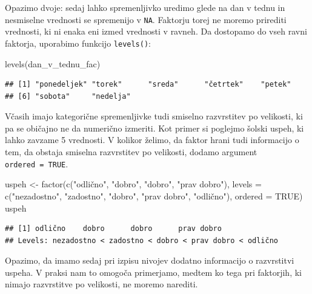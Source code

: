 \documentclass[
]{book}
\newenvironment{Shaded}{\begin{snugshade}}{\end{snugshade}}
\newcommand{\AttributeTok}[1]{\textcolor[rgb]{0.77,0.63,0.00}{#1}}
\newcommand{\ConstantTok}[1]{\textcolor[rgb]{0.00,0.00,0.00}{#1}}
\newcommand{\FunctionTok}[1]{\textcolor[rgb]{0.00,0.00,0.00}{#1}}
\newcommand{\NormalTok}[1]{#1}
\newcommand{\OtherTok}[1]{\textcolor[rgb]{0.56,0.35,0.01}{#1}}
\newcommand{\StringTok}[1]{\textcolor[rgb]{0.31,0.60,0.02}{#1}}
\begin{document}
Opazimo dvoje: sedaj lahko spremenljivko uredimo glede na dan v tednu in nesmiselne vrednosti se spremenijo v \texttt{NA}. Faktorju torej ne moremo prirediti vrednosti, ki ni enaka eni izmed vrednosti v ravneh. Da dostopamo do vseh ravni faktorja, uporabimo funkcijo \texttt{levels()}:

\begin{Shaded}
\begin{Highlighting}[]
\FunctionTok{levels}\NormalTok{(dan\_v\_tednu\_fac)}
\end{Highlighting}
\end{Shaded}

\begin{verbatim}
## [1] "ponedeljek" "torek"      "sreda"      "četrtek"    "petek"     
## [6] "sobota"     "nedelja"
\end{verbatim}

Včasih imajo kategorične spremenljivke tudi smiselno razvrstitev po velikosti, ki pa se običajno ne da numerično izmeriti. Kot primer si poglejmo šolski uspeh, ki lahko zavzame 5 vrednosti. V kolikor želimo, da faktor hrani tudi informacijo o tem, da obstaja smiselna razvrstitev po velikosti, dodamo argument \texttt{ordered\ =\ TRUE}.

\begin{Shaded}
\begin{Highlighting}[]
\NormalTok{uspeh }\OtherTok{\textless{}{-}} \FunctionTok{factor}\NormalTok{(}\FunctionTok{c}\NormalTok{(}\StringTok{"odlično"}\NormalTok{, }\StringTok{"dobro"}\NormalTok{, }\StringTok{"dobro"}\NormalTok{, }\StringTok{"prav dobro"}\NormalTok{),}
                \AttributeTok{levels =} \FunctionTok{c}\NormalTok{(}\StringTok{"nezadostno"}\NormalTok{, }\StringTok{"zadostno"}\NormalTok{, }\StringTok{"dobro"}\NormalTok{, }\StringTok{"prav dobro"}\NormalTok{, }\StringTok{"odlično"}\NormalTok{),}
                \AttributeTok{ordered =} \ConstantTok{TRUE}\NormalTok{)}
\NormalTok{uspeh}
\end{Highlighting}
\end{Shaded}

\begin{verbatim}
## [1] odlično    dobro      dobro      prav dobro
## Levels: nezadostno < zadostno < dobro < prav dobro < odlično
\end{verbatim}

Opazimo, da imamo sedaj pri izpisu nivojev dodatno informacijo o razvrstitvi uspeha. V praksi nam to omogoča primerjamo, medtem ko tega pri faktorjih, ki nimajo razvrstitve po velikosti, ne moremo narediti.
\end{document}
